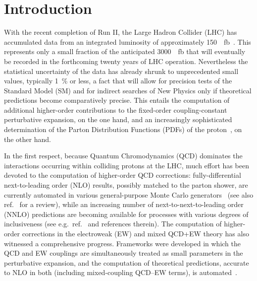 \section{Introduction}
\label{sec:introduction}

With the recent completion of Run II, the Large Hadron Collider (LHC) has 
accumulated data from an integrated luminosity of approximately 
\SI{150}{\per\femto\barn}~\cite{Mangano:2020icy}. This represents only a small fraction of
the anticipated \SI{3000}{\per\femto\barn} that will eventually be recorded in the
forthcoming twenty years of LHC operation. Nevertheless the statistical 
uncertainty of the data has already shrunk to unprecedented small values,
typically \SI{1}{\percent} or less, a fact that will allow for precision tests of the
Standard Model (SM) and for indirect searches of New Physics only if 
theoretical predictions become comparatively precise. This entails the 
computation of additional higher-order contributions to the fixed-order 
coupling-constant perturbative expansion, on the one hand, and an increasingly 
sophisticated determination of the Parton Distribution Functions (PDFs) of the 
proton~\cite{Gao:2017yyd,Ethier:2020way}, on the other hand. 

In the first respect, because Quantum Chromodynamics (QCD) dominates the 
interactions occurring within colliding protons at the LHC, much effort 
has been devoted to the computation of higher-order QCD corrections: 
fully-differential next-to-leading order (NLO) results, possibly matched to the
parton shower, are currently automated in various general-purpose
Monte Carlo generators~\cite{Gleisberg:2008ta,Alwall:2014hca,Bellm:2015jjp}
(see also ref.~\cite{Buckley:2011ms} for a review),
while an increasing number of next-to-next-to-leading order (NNLO) predictions 
are becoming available for processes with various degrees of inclusiveness
(see e.g.\ ref.~\cite{Amoroso:2020lgh} and references therein). The computation
of higher-order corrections in the electroweak (EW) and mixed QCD+EW theory has
also witnessed a comprehensive progress. Frameworks 
were developed in which the QCD and EW couplings are simultaneously treated as 
small parameters in the perturbative expansion, and the computation of 
theoretical predictions, accurate to NLO in both (including mixed-coupling 
QCD--EW terms), is automated~\cite{Biedermann:2017yoi,Frederix:2018nkq}.

